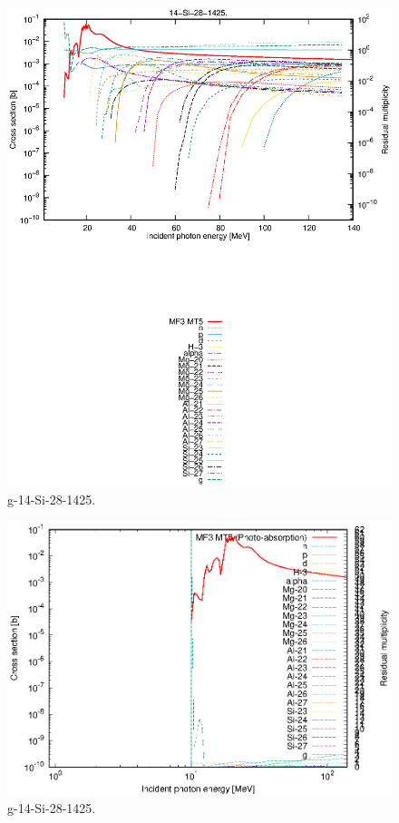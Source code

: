 \begin{figure}
 \includegraphics[width=\linewidth]{eps/g_14-Si-28_1425.eps}
  \caption{g-14-Si-28-1425.}
\end{figure}
\newpage \clearpage

\begin{figure}
 \includegraphics[width=\linewidth]{eps-log/g_14-Si-28_1425.eps}
 \caption{g-14-Si-28-1425.}
\end{figure}
\newpage \clearpage

